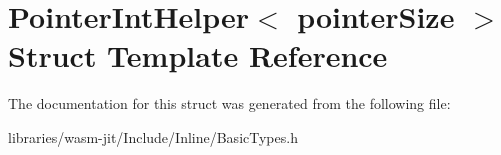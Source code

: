 \hypertarget{struct_pointer_int_helper}{}\section{Pointer\+Int\+Helper$<$ pointer\+Size $>$ Struct Template Reference}
\label{struct_pointer_int_helper}


The documentation for this struct was generated from the following file\+:\begin{DoxyCompactItemize}
\item 
libraries/wasm-\/jit/\+Include/\+Inline/Basic\+Types.\+h\end{DoxyCompactItemize}
